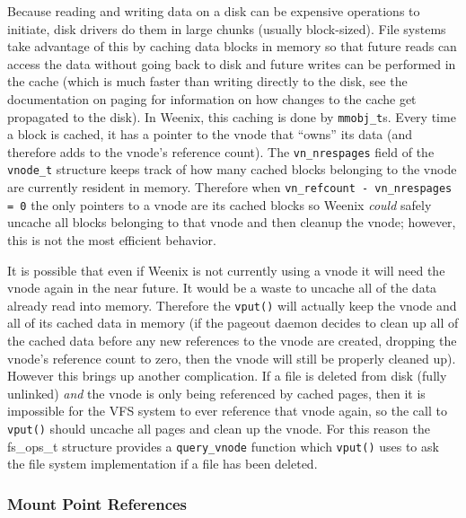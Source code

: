 
Because reading and writing data on a disk can be expensive operations to initiate, disk drivers do them in large chunks (usually block-sized). File systems take advantage of this by caching data blocks in memory so that future reads can access the data without going back to disk and future writes can be performed in the cache (which is much faster than writing directly to the disk, see the documentation on paging for information on how changes to the cache get propagated to the disk). In Weenix, this caching is done by \texttt{mmobj\_t}s. Every time a block is cached, it has a pointer to the vnode that ``owns'' its data (and therefore adds to the vnode's reference count). The \texttt{vn\_nrespages} field of the \texttt{vnode\_t} structure keeps track of how many cached blocks belonging to the vnode are currently resident in memory. Therefore when \texttt{vn\_refcount - vn\_nrespages = 0} the only pointers to a vnode are its cached blocks so Weenix \emph{could} safely uncache all blocks belonging to that vnode and then cleanup the vnode; however, this is not the most efficient behavior.

It is possible that even if Weenix is not currently using a vnode it will need the vnode again in the near future. It would be a waste to uncache all of the data already read into memory. Therefore the \texttt{vput()} will actually keep the vnode and all of its cached data in memory (if the pageout daemon decides to clean up all of the cached data before any new references to the vnode are created, dropping the vnode's reference count to zero, then the vnode will still be properly cleaned up). However this brings up another complication. If a file is deleted from disk (fully unlinked) \emph{and} the vnode is only being referenced by cached pages, then it is impossible for the VFS system to ever reference that vnode again, so the call to \texttt{vput()} should uncache all pages and clean up the vnode. For this reason the fs\_ops\_t structure provides a \texttt{query\_vnode} function which \texttt{vput()} uses to ask the file system implementation if a file has been deleted.

\subsubsection{Mount Point References}

